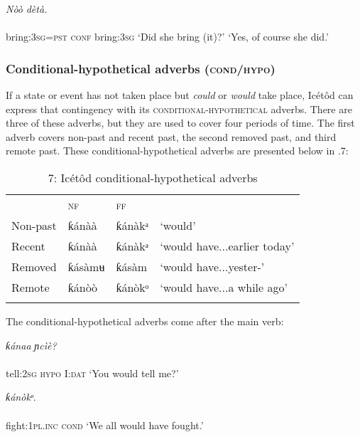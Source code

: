 \ea\label{ex:}
      \textit{Nòò}\textit{   dètà.} \\
    \\
bring:\textsc{3sg=pst}    \textsc{conf}   bring:\textsc{3sg}
\glt ‘Did she bring (it)?’    ‘Yes, of course she did.’ 
\z




\subsubsection{Conditional-hypothetical adverbs (\textsc{cond}/\textsc{hypo})}

If a state or event has not taken place but \textit{could} or \textit{would} take place, Icétôd can express that contingency with its \textsc{conditional-hypothetical} adverbs. There are three of these adverbs, but they are used to cover four periods of time. The first adverb covers non-past and recent past, the second removed past, and third remote past. These conditional-hypothetical adverbs are presented below in .7:


\begin{table}
\caption{7: Icétôd conditional-hypothetical adverbs}
\label{tab:9}


\begin{tabularx}{\textwidth}{XXXX} & \textsc{nf} & \textsc{ff} & \\
\lsptoprule
Non-past & ƙánàà & ƙánàkᵃ & ‘would’\\
Recent & ƙánàà & ƙánàkᵃ & ‘would have...earlier today’\\
Removed & ƙásàmʉ & ƙásàm & ‘would have...yester-’\\
Remote & ƙánòò & ƙánòkᵒ & ‘would have...a while ago’\\
\lspbottomrule
\end{tabularx}
\end{table}
The conditional-hypothetical adverbs come after the main verb:




\ea\label{ex:}
     \textit{ƙánaa}\textit{   ɲcìè?} \\
    \\
tell:\textsc{2sg}   \textsc{hypo}     I:\textsc{dat}
\glt ‘You would tell me?’ 
\z




\ea\label{ex:}
   \textit{ƙánòkᵒ}. \\
    \\
fight:\textsc{1pl.inc cond}
\glt ‘We all would have fought.’ 
\z




